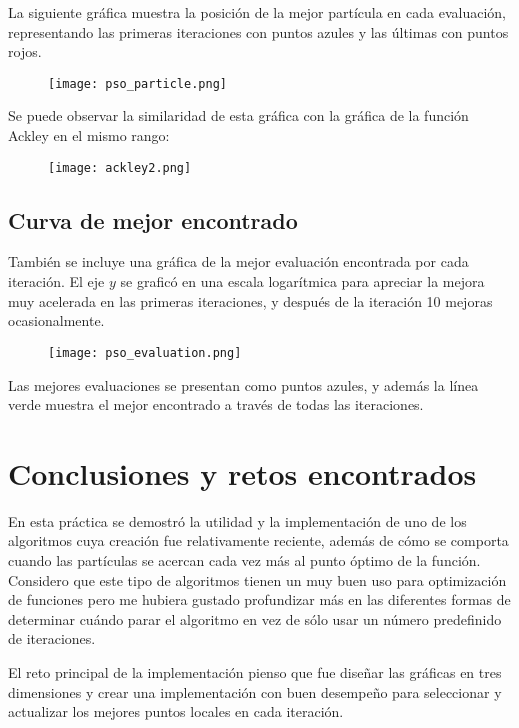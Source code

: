 \documentclass[sigconf,authorversion,nonacm]{acmart}
\begin{document}
La siguiente gráfica muestra la posición de la mejor partícula en cada evaluación, representando las primeras iteraciones con puntos azules y las últimas con puntos rojos.

\begin{figure}[H]
  \centering
  \texttt{[image: pso\_particle.png]}
\end{figure}

Se puede observar la similaridad de esta gráfica con la gráfica de la función Ackley en el mismo rango:

\begin{figure}[H]
  \centering
  \texttt{[image: ackley2.png]}
\end{figure}

\subsection{Curva de mejor encontrado}
También se incluye una gráfica de la mejor evaluación encontrada por cada iteración. El eje $y$ se graficó en una escala logarítmica para apreciar la mejora muy acelerada en las primeras iteraciones, y después de la iteración 10 mejoras ocasionalmente.

\begin{figure}[H]
  \centering
  \texttt{[image: pso\_evaluation.png]}
\end{figure}

Las mejores evaluaciones se presentan como puntos azules, y además la línea verde muestra el mejor encontrado a través de todas las iteraciones.

\section{Conclusiones y retos encontrados}
En esta práctica se demostró la utilidad y la implementación de uno de los algoritmos cuya creación fue relativamente reciente, además de cómo se comporta cuando las partículas se acercan cada vez más al punto óptimo de la función. Considero que este tipo de algoritmos tienen un muy buen uso para optimización de funciones pero me hubiera gustado profundizar más en las diferentes formas de determinar cuándo parar el algoritmo en vez de sólo usar un número predefinido de iteraciones. 

El reto principal de la implementación pienso que fue diseñar las gráficas en tres dimensiones y crear una implementación con buen desempeño para seleccionar y actualizar los mejores puntos locales en cada iteración.
\end{document}

